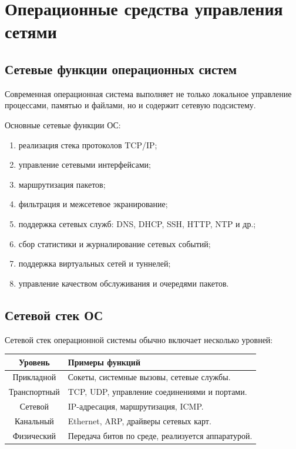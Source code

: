 \documentclass[12pt,a4paper]{article}
\begin{document}
\section{Операционные средства управления сетями}

\subsection{Сетевые функции операционных систем}

Современная операционная система выполняет не только локальное управление процессами, памятью и файлами, но и содержит сетевую подсистему.

Основные сетевые функции ОС:
\begin{enumerate}
    \item реализация стека протоколов TCP/IP;
    \item управление сетевыми интерфейсами;
    \item маршрутизация пакетов;
    \item фильтрация и межсетевое экранирование;
    \item поддержка сетевых служб: DNS, DHCP, SSH, HTTP, NTP и др.;
    \item сбор статистики и журналирование сетевых событий;
    \item поддержка виртуальных сетей и туннелей;
    \item управление качеством обслуживания и очередями пакетов.
\end{enumerate}

\subsection{Сетевой стек ОС}

Сетевой стек операционной системы обычно включает несколько уровней:

\begin{center}
\begin{tabular}{|c|p{}|}
\hline
\textbf{Уровень} & \textbf{Примеры функций} \\
\hline
Прикладной & Сокеты, системные вызовы, сетевые службы. \\
\hline
Транспортный & TCP, UDP, управление соединениями и портами. \\
\hline
Сетевой & IP-адресация, маршрутизация, ICMP. \\
\hline
Канальный & Ethernet, ARP, драйверы сетевых карт. \\
\hline
Физический & Передача битов по среде, реализуется аппаратурой. \\
\hline
\end{tabular}
\end{center}
\end{document}
